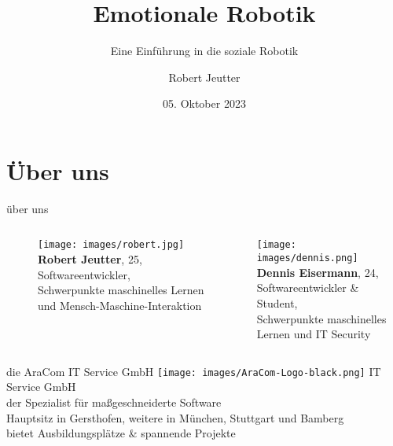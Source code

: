 \documentclass[aspectratio=169]{beamer}
\title{Emotionale Robotik}
\subtitle{Eine Einführung in die soziale Robotik}
\author{Robert Jeutter}
\date{05. Oktober 2023}
\begin{document}
\maketitle

\section{Über uns}
\begin{frame}{über uns}
  \begin{columns}
    \begin{column}{0.45\textwidth}
      \begin{figure}[h]
        \centering
        \texttt{[image: images/robert.jpg]}\\
        \textbf{Robert Jeutter}, 25,\\
        Softwareentwickler,\\
        \scriptsize{Schwerpunkte maschinelles Lernen und Mensch-Maschine-Interaktion}
      \end{figure}
    \end{column}
    \begin{column}{0.45\textwidth}
      \texttt{[image: images/dennis.png]}\\
      \textbf{Dennis Eisermann}, 24,\\
      Softwareentwickler \& Student,\\
      \scriptsize{Schwerpunkte maschinelles Lernen und IT Security}
    \end{column}
  \end{columns}
\end{frame}
\begin{frame}{die AraCom IT Service GmbH}
  \texttt{[image: images/AraCom-Logo-black.png]}
  IT Service GmbH\\
  der Spezialist für maßgeschneiderte Software\\
  Hauptsitz in Gersthofen, weitere in München, Stuttgart und Bamberg\\
  bietet Ausbildungsplätze \& spannende Projekte
\end{frame}
\end{document}
